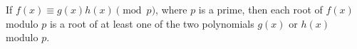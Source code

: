 If $f(x) \equiv g(x)h(x) \pmod{p}$, where $p$ is a prime, then each root of $f(x)$ modulo $p$ is a root of at least one of the two polynomials $g(x)$ or $h(x)$ modulo $p$.

